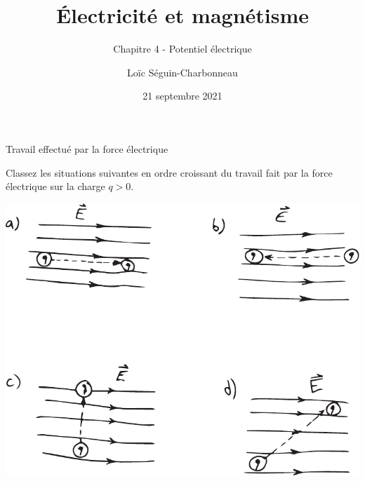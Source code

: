 \documentclass{beamer}
\title{Électricité et magnétisme}
\subtitle{Chapitre 4 - Potentiel électrique}
\date{21 septembre 2021}
\author{Loïc Séguin-Charbonneau}
\institute{Cégep Édouard-Montpetit}
\begin{document}
\maketitle


\begin{frame}[t]{Travail effectué par la force électrique}

Classez les situations suivantes en ordre croissant du travail fait par la
force électrique sur la charge $q > 0$.

\begin{center}
  \includegraphics[scale=0.6]{figures/travail-force-electrique.pdf}
\end{center}

\end{frame}





\end{document}

